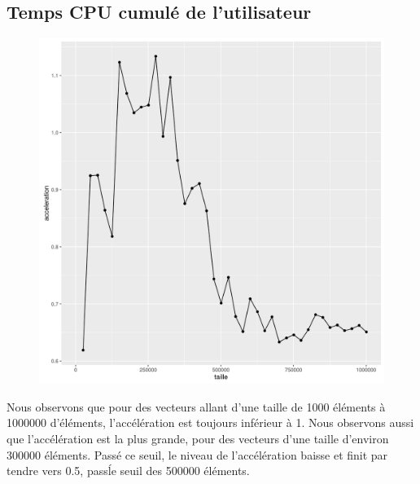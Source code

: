 \documentclass[a4paper,11pt]{scrartcl}
\begin{document}
\subsection{Temps CPU cumul\'e de l'utilisateur}
\begin{figure}[H] \center
    \includegraphics[scale=0.5] {graphes/temps_user_accel16.png}
\end{figure}
Nous observons que pour des vecteurs allant d'une taille de 1000 \'el\'ements \`a 1000000 d'\'el\'ements, l'acc\'el\'eration est toujours inf\'erieur \`a 1. Nous observons aussi que l'acc\'el\'eration est la plus grande, pour des vecteurs d'une taille d'environ 300000 \'el\'ements. Pass\'e ce seuil, le niveau de l'acc\'el\'eration baisse et finit par tendre vers 0.5, pass\' le seuil des 500000 \'el\'ements.
\end{document}
